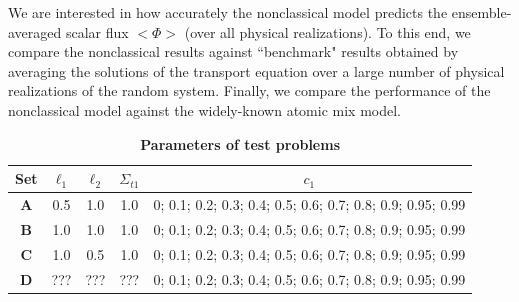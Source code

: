 \documentclass[12pt]{article}
\newcommand{\bl}{\big<}
\newcommand{\bg}{\big>}
\begin{document}
We are interested in how accurately the nonclassical model predicts the ensemble-averaged scalar flux $\bl\Phi\bg$ (over all physical realizations).
To this end, we compare the nonclassical results against ``benchmark" results obtained by averaging the solutions of the transport equation over a large number of physical realizations of the random system.
Finally, we compare the performance of the nonclassical model against the widely-known atomic mix model.
\begin{table}[htb]
\centering
\caption{\bf Parameters of test problems}
\label{tab1} 
\begin{tabular}{||c|c|c|c|c||} \hline \hline
\textbf{Set}  & $\ell_1$ & $\ell_2$ & $\Sigma_{t1}$ &$c_1$ \\ \hline\hline
\textbf{A} & 0.5 & 1.0 & 1.0 & 0; 0.1; 0.2; 0.3; 0.4; 0.5; 0.6; 0.7; 0.8; 0.9; 0.95; 0.99\\
\hline
\textbf{B} & 1.0 & 1.0 & 1.0 & 0; 0.1; 0.2; 0.3; 0.4; 0.5; 0.6; 0.7; 0.8; 0.9; 0.95; 0.99\\
\hline
\textbf{C} & 1.0 & 0.5 & 1.0 & 0; 0.1; 0.2; 0.3; 0.4; 0.5; 0.6; 0.7; 0.8; 0.9; 0.95; 0.99\\
\hline
\textbf{D} & ??? & ??? & ??? & 0; 0.1; 0.2; 0.3; 0.4; 0.5; 0.6; 0.7; 0.8; 0.9; 0.95; 0.99\\
 \hline\hline  
  \end{tabular}
\end{table}
\end{document}
